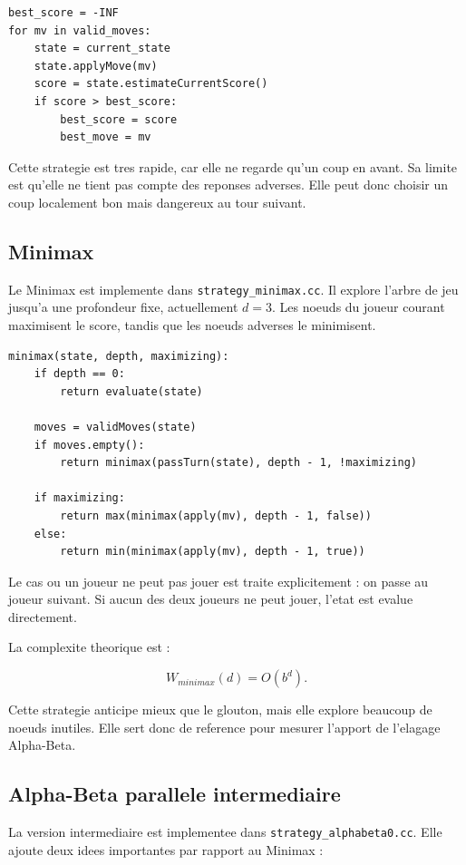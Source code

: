 \documentclass[12pt,a4paper]{article}
\begin{document}
    \begin{lstlisting}
best_score = -INF
for mv in valid_moves:
    state = current_state
    state.applyMove(mv)
    score = state.estimateCurrentScore()
    if score > best_score:
        best_score = score
        best_move = mv
    \end{lstlisting}


    Cette strategie est tres rapide, car elle ne regarde qu'un coup en avant. Sa limite est qu'elle ne
    tient pas compte des reponses adverses. Elle peut donc choisir un coup localement bon mais dangereux
    au tour suivant.

    \subsection{Minimax }

    Le Minimax est implemente dans \texttt{strategy\_minimax.cc}. Il explore l'arbre de jeu jusqu'a une
    profondeur fixe, actuellement $d = 3$. Les noeuds du joueur courant maximisent le score, tandis que
    les noeuds adverses le minimisent.

    \begin{lstlisting}
minimax(state, depth, maximizing):
    if depth == 0:
        return evaluate(state)

    moves = validMoves(state)
    if moves.empty():
        return minimax(passTurn(state), depth - 1, !maximizing)

    if maximizing:
        return max(minimax(apply(mv), depth - 1, false))
    else:
        return min(minimax(apply(mv), depth - 1, true))
    \end{lstlisting}

    Le cas ou un joueur ne peut pas jouer est traite explicitement : on passe au joueur suivant. Si aucun
    des deux joueurs ne peut jouer, l'etat est evalue directement.

    La complexite theorique est :

    \[
        W_{minimax}(d) = O(b^d).
    \]

    Cette strategie anticipe mieux que le glouton, mais elle explore beaucoup de noeuds inutiles. Elle
    sert donc de reference pour mesurer l'apport de l'elagage Alpha-Beta.

    \subsection{Alpha-Beta parallele intermediaire}

    La version intermediaire est implementee dans \texttt{strategy\_alphabeta0.cc}. Elle ajoute deux idees
    importantes par rapport au Minimax :
\end{document}

